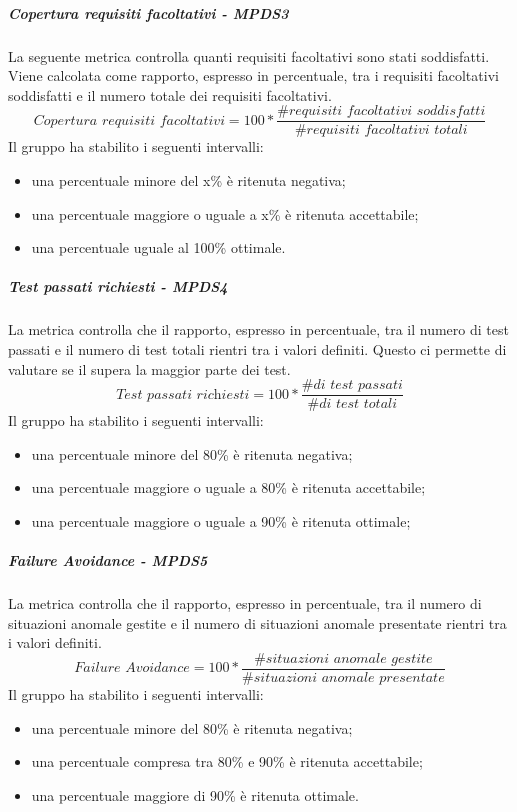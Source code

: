 \documentclass[PianoDiQualifica.tex]{subfiles}
\begin{document}
							\hypertarget{req_facoltativi}{\subparagraph{Copertura requisiti facoltativi - MPDS3}}
				La seguente metrica controlla quanti requisiti facoltativi sono stati soddisfatti. Viene calcolata come rapporto, espresso in percentuale, tra i requisiti facoltativi soddisfatti e
				il numero totale dei requisiti facoltativi. \\
				\begin{equation}\textit{Copertura requisiti facoltativi} = 100 * \frac{\textit{\#requisiti facoltativi soddisfatti}}{\textit{\#requisiti facoltativi totali}}\end{equation}
				Il gruppo ha stabilito i seguenti intervalli:
				\begin{itemize}
					\item una percentuale minore del x\% è ritenuta negativa;
					\item una percentuale maggiore o uguale a x\% è ritenuta accettabile;
					\item una percentuale uguale al 100\% ottimale.
				\end{itemize}
				
				
				\hypertarget{test_passati}{\subparagraph{Test passati richiesti - MPDS4}}
				La metrica controlla che il rapporto, espresso in percentuale, tra il numero di test passati e il numero di test totali rientri tra i valori definiti. Questo ci permette
				di valutare se il  supera la maggior parte dei test. \\
				\begin{equation}\textit{Test passati richiesti} = 100 * \frac{\textit{\# di test passati}}{\textit{\# di test totali}}\end{equation}
				Il gruppo ha stabilito i seguenti intervalli:
				\begin{itemize}
					\item una percentuale minore del 80\% è ritenuta negativa;
					\item una percentuale maggiore o uguale a 80\% è ritenuta accettabile;
					\item una percentuale maggiore o uguale a 90\% è ritenuta ottimale;
				\end{itemize}
				
				\hypertarget{failure}{\subparagraph{Failure Avoidance - MPDS5}}
				La metrica controlla che il rapporto, espresso in percentuale, tra il numero di situazioni anomale gestite e il numero di situazioni anomale presentate rientri tra i valori definiti.
				\begin{equation}\textit{Failure Avoidance} = 100 * \frac{\textit{\# situazioni anomale gestite}}{\textit{\# situazioni anomale presentate}}\end{equation}
				Il gruppo ha stabilito i seguenti intervalli:
				\begin{itemize}
					\item una percentuale minore del 80\% è ritenuta negativa;
					\item una percentuale compresa tra 80\% e 90\% è ritenuta accettabile;
					\item una percentuale maggiore di 90\% è ritenuta ottimale.
				\end{itemize}
				
\end{document}
